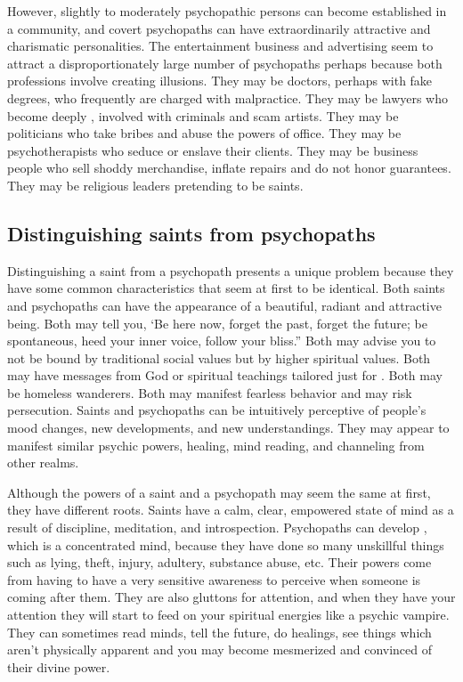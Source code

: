 \documentclass[a5paper,10pt,english]{book}
\begin{document}
\sphinxAtStartPar
However, slightly to moderately psychopathic persons can become
established in a community, and covert psychopaths can have
extraordinarily attractive and charismatic personalities. The
entertainment business and advertising seem to attract a
disproportionately large number of psychopaths perhaps because both
professions involve creating illusions. They may be doctors, perhaps
with fake degrees, who frequently are charged with malpractice. They may
be lawyers who become deeply , involved with criminals and scam artists.
They may be politicians who take bribes and abuse the powers of office.
They may be psychotherapists who seduce or enslave their clients. They
may be business people who sell shoddy merchandise, inflate repairs and
do not honor guarantees. They may be religious leaders pretending to be
saints.


\subsection{Distinguishing saints from psychopaths}
\label{\detokenize{psychopaths:distinguishing-saints-from-psychopaths}}
\sphinxAtStartPar
Distinguishing a saint from a psychopath presents a unique problem
because they have some common characteristics that seem at first to be
identical. Both saints and psychopaths can have the appearance of a
beautiful, radiant and attractive being. Both may tell you, ‘Be here
now, forget the past, forget the future; be spontaneous, heed your inner
voice, follow your bliss.” Both may advise you to not be bound by
traditional social values but by higher spiritual values. Both may have
messages from God or spiritual teachings tailored just for .
Both may be homeless wanderers. Both may manifest fearless behavior
and may risk persecution. Saints and psychopaths can be intuitively
perceptive of people’s mood changes, new developments, and new
understandings. They may appear to manifest similar psychic powers,
healing, mind reading, and channeling from other realms.

\sphinxAtStartPar
Although the powers of a saint and a psychopath may seem the same at
first, they have different roots. Saints have a calm, clear, empowered
state of mind as a result of discipline, meditation, and introspection.
Psychopaths can develop , which is a concentrated
mind, because they have done so many unskillful things such as lying,
theft, injury, adultery, substance abuse, etc. Their powers come from
having to have a very sensitive awareness to perceive when someone is
coming after them. They are also gluttons for attention, and when they
have your attention they will start to feed on your spiritual energies
like a psychic vampire. They can sometimes read minds, tell the future,
do healings, see things which aren’t physically apparent and you may
become mesmerized and convinced of their divine power.
\end{document}

